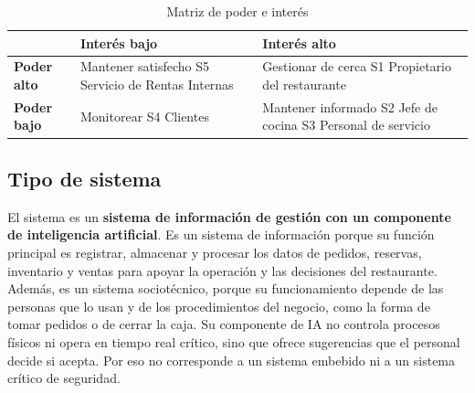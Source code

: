 \begin{table}[H]
\centering\footnotesize
\caption{Matriz de poder e interés}\label{tab:poder-interes}
\begin{tabular}{@{}p{}|p{}|p{}@{}}
\toprule
 & \textbf{Interés bajo} & \textbf{Interés alto}\\
\midrule
\textbf{Poder alto} & Mantener satisfecho \newline S5 Servicio de Rentas Internas & Gestionar de cerca \newline S1 Propietario del restaurante\\
\midrule
\textbf{Poder bajo} & Monitorear \newline S4 Clientes & Mantener informado \newline S2 Jefe de cocina \newline S3 Personal de servicio\\
\bottomrule
\end{tabular}
\end{table}

\subsection{Tipo de sistema}
El sistema es un \textbf{sistema de información de gestión con un componente de inteligencia artificial}. Es un sistema de información porque su función principal es registrar, almacenar y procesar los datos de pedidos, reservas, inventario y ventas para apoyar la operación y las decisiones del restaurante. Además, es un sistema sociotécnico, porque su funcionamiento depende de las personas que lo usan y de los procedimientos del negocio, como la forma de tomar pedidos o de cerrar la caja. Su componente de IA no controla procesos físicos ni opera en tiempo real crítico, sino que ofrece sugerencias que el personal decide si acepta. Por eso no corresponde a un sistema embebido ni a un sistema crítico de seguridad.
